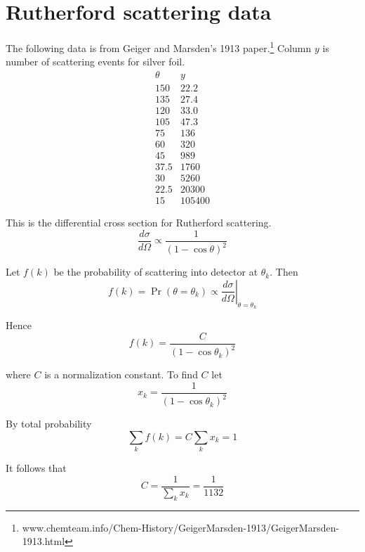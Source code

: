

\section*{Rutherford scattering data}

The following data is from Geiger and Marsden's 1913 paper.\footnote{www.chemteam.info/Chem-History/GeigerMarsden-1913/GeigerMarsden-1913.html}
Column $y$ is number of scattering events for silver foil.
\begin{equation*}
\begin{matrix}
\theta & y\\
150 & 22.2\\
135 & 27.4\\
120 & 33.0\\
105 & 47.3\\
75 & 136\\
60 & 320\\
45 & 989\\
37.5 & 1760\\
30 & 5260\\
22.5 & 20300\\
15 & 105400
\end{matrix}
\end{equation*}

This is the differential cross section for Rutherford scattering.
\begin{equation*}
\frac{d\sigma}{d\Omega}\propto
\frac{1}{(1-\cos\theta)^2}
\end{equation*}

Let $f(k)$ be the probability of scattering into detector at $\theta_k$.
Then
\begin{equation*}
f(k)=\Pr(\theta=\theta_k)\propto\left.\frac{d\sigma}{d\Omega}\right|_{\theta=\theta_k}
\end{equation*}

Hence
\begin{equation*}
f(k)=\frac{C}{(1-\cos\theta_k)^2}
\end{equation*}

where $C$ is a normalization constant.
To find $C$ let
\begin{equation*}
x_k=\frac{1}{(1-\cos\theta_k)^2}
\end{equation*}

By total probability
\begin{equation*}
\sum_k f(k)=C\sum_k x_k=1
\end{equation*}

It follows that
\begin{equation*}
C=\frac{1}{\sum_k x_k}=\frac{1}{1132}
\end{equation*}

